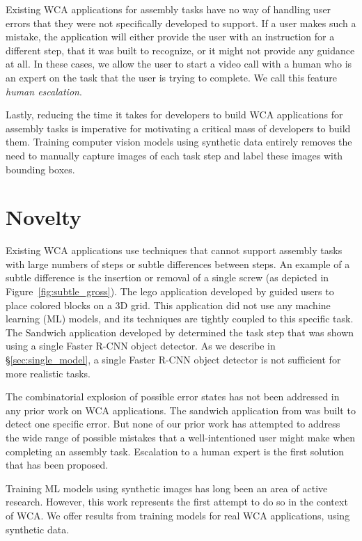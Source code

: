 Existing WCA applications for assembly tasks have no way of handling user
errors that they were not specifically developed to support.
If a user makes such a mistake, the application will either provide
the user with an instruction for a different step, that it was built to
recognize, or it might not provide any guidance at all.
In these cases, we allow the user to start a video call with a human who is
an expert on the task that the user is trying to complete.
We call this feature \emph{human escalation}.

Lastly, reducing the time it takes for developers to build WCA applications for
assembly tasks is imperative for motivating a critical mass of developers to
build them.
Training computer vision models using synthetic data entirely removes the need
to manually capture images of each task step and label these images with
bounding boxes.

\section{Novelty}

Existing WCA applications use techniques that cannot support assembly tasks
with large numbers of steps or subtle differences between steps.
An example of a subtle difference is the insertion or removal of a single
screw (as depicted in Figure~{\ref{fig:subtle_gross}}).
The lego application developed by \citet{chen2017} guided users to place colored
blocks on a 3D grid.
This application did not use any machine learning (ML) models, and its
techniques are tightly coupled to this specific task.
The Sandwich application developed by \citet{chen2017} determined the task step
that was shown using a single Faster R-CNN object detector.
As we describe in \S\ref{sec:single_model}, a single Faster R-CNN object
detector is not sufficient for more realistic tasks.

The combinatorial explosion of possible error states has not been addressed in
any prior work on WCA applications.
The sandwich application from \citet{chen2017} was built to detect one specific
error.
But none of our prior work has attempted to address the wide range of possible
mistakes that a well-intentioned user might make when completing an assembly
task.
Escalation to a human expert is the first solution that has been proposed.

Training ML models using synthetic images has long been an area of active
research.
However, this work represents the first attempt to do so in the context of
WCA.
We offer results from training models for real WCA applications, using synthetic
data.

